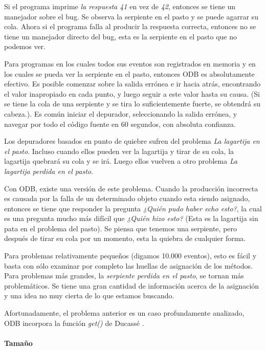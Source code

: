 \documentclass[12pt,legalpaper]{report}
\begin{document}
Si el programa imprime \textit{la respuesta 41} en vez de \textit{42}, entonces se tiene un manejador sobre el bug.  Se observa la serpiente en el pasto y se puede agarrar su cola.  Ahora si el programa falla al producir la respuesta correcta, entonces no se tiene un manejador directo del bug, esta es la serpiente en el pasto que no podemos ver.

Para programas en los cuales todos sus eventos son registrados en memoria y en los cuales se pueda ver la serpiente en el pasto, entonces ODB es absolutamente efectivo.  Es posible comenzar sobre la salida errónea e ir hacia atrás, encontrando el valor inapropiado en cada punto, y luego seguir a este valor hasta su causa. (Si se tiene la cola de una serpiente y se tira lo suficientemente fuerte, se obtendrá su cabeza.). Es común iniciar el depurador, seleccionando la salida errónea, y navegar por todo el código fuente en 60 segundos, con absoluta confianza.

Los depuradores basados en punto de quiebre sufren del problema \textit{La lagartija en el pasto}.  Incluso cuando ellos pueden ver la lagartija y tirar de su cola, la lagartija quebrará su cola y se irá.  Luego ellos vuelven a otro problema \textit{La lagartija perdida en el pasto}.

Con ODB, existe una versión de este problema.  Cuando la producción incorrecta es causada por la falla de un determinado objeto cuando esta siendo asignado, entonces se tiene que responder la pregunta \textit{¿Quién pudo haber echo esto?}, la cual es una pregunta mucho más difícil que \textit{¿Quién hizo esto?} (Esta es la lagartija sin pata en el problema del pasto).  Se piensa que tenemos una serpiente, pero después de tirar su cola por un momento, esta la quiebra de cualquier forma.

Para problemas relativamente pequeños (digamos 10.000 eventos), esto es fácil y basta con sólo examinar por completo las huellas de asignación de los métodos.  Para problemas más grandes, la \textit{serpiente perdida en el pasto}, se tornan más problemáticos.  Se tiene una gran cantidad de información acerca de la asignación y una idea no muy cierta de lo que estamos buscando.

Afortunadamente, el problema anterior es un caso profundamente analizado, ODB incorpora la función \textit{get()} de Ducassé \cite{ducasse}.

				\paragraph{Tamaño}
\end{document}
